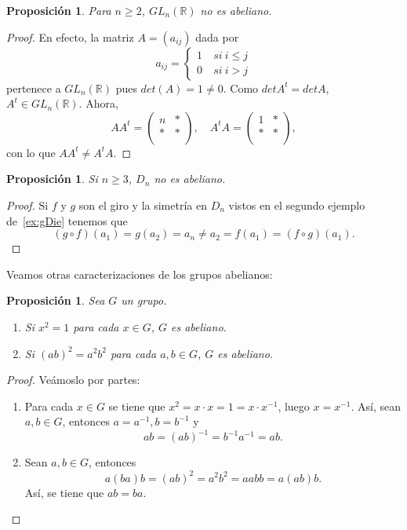 \documentclass[12pt]{article}
\newtheorem{proposition}[theorem]{Proposición}
\begin{document}
\begin{proposition}Para $n \geq 2$, $GL_n(\mathbb{R})$ no es abeliano.
\end{proposition}
\begin{proof}
En efecto, la matriz $A = (a_{ij})$ dada por $$a_{ij} = \left\{
    \begin{array}{ll}
        1 &~si~i \leq j \\
        0 &~si~ i >j
    \end{array}
\right.$$
pertenece a $GL_n(\mathbb{R})$ pues $det(A)= 1 \neq 0$. Como $det A^t = det A$, $A^t \in GL_n(\mathbb{R})$. Ahora, $$AA^t = \left(
\begin{array}{c|c}
    n & \ast \\ \hline
    \ast & \ast \\
\end{array}
\right), \quad A^tA = \left(
\begin{array}{c|c}
    1 & \ast \\ \hline
    \ast & \ast \\
\end{array}
\right),$$
con lo que $AA^t \neq A^tA$.

\end{proof}

\begin{proposition}\label{prop:abDie} Si $n \geq 3$, $D_n$ no es abeliano.
\end{proposition}
\begin{proof}
Si $f$ y $g$ son el giro y la simetría en $D_n$ vistos en el segundo ejemplo de~\ref{ex:gDie} tenemos que $$(g \circ f)(a_1) = g(a_2) = a_n \neq a_2 = f(a_1) = (f\circ g)(a_1).$$

\end{proof}

Veamos otras caracterizaciones de los grupos abelianos:

\begin{proposition}\label{prop:gAbe} Sea $G$ un grupo. 
\begin{enumerate}
\item Si $x^2 = 1$ para cada $x \in G$, $G$ es abeliano.
\item Si $(ab)^2 = a^2b^2$ para cada $a,b \in G$, $G$ es abeliano.
\end{enumerate}
\end{proposition}
\begin{proof} Veámoslo por partes:
\begin{enumerate}
\item Para cada $x \in G$ se tiene que $x^2 = x \cdot x = 1 = x \cdot x^{-1}$, luego $x = x^{-1}$. Así, sean $a,b \in G$, entonces $a = a^{-1}, b = b^{-1}$ y $$ab = (ab)^{-1} = b^{-1}a^{-1} = ab.$$
\item Sean $a,b \in G$, entonces $$a(ba)b = (ab)^2 = a^2b^2 = aabb = a(ab)b.$$ Así, se tiene que $ab = ba$.
\end{enumerate}

\end{proof}
\end{document}
